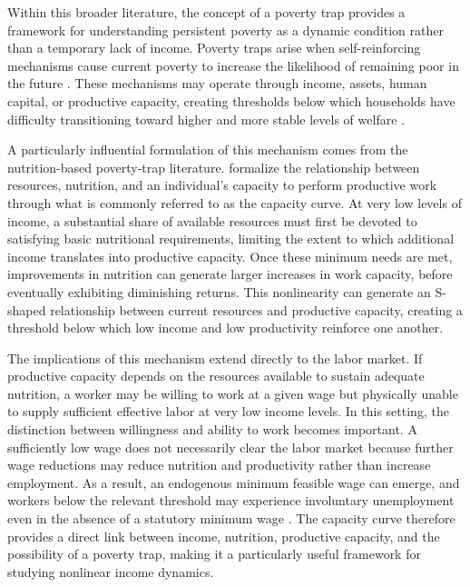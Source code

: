 \documentclass{article}
\begin{document}
Within this broader literature, the concept of a poverty trap provides a framework for understanding persistent poverty as a dynamic condition rather than a temporary lack of income. Poverty traps arise when self-reinforcing mechanisms cause current poverty to increase the likelihood of remaining poor in the future \parencite{kraay2014poverty}. These mechanisms may operate through income, assets, human capital, or productive capacity, creating thresholds below which households have difficulty transitioning toward higher and more stable levels of welfare \parencite{carterbarrett2006}.

A particularly influential formulation of this mechanism comes from the nutrition-based poverty-trap literature. \textcite{dasgupta1986} formalize the relationship between resources, nutrition, and an individual's capacity to perform productive work through what is commonly referred to as the capacity curve. At very low levels of income, a substantial share of available resources must first be devoted to satisfying basic nutritional requirements, limiting the extent to which additional income translates into productive capacity. Once these minimum needs are met, improvements in nutrition can generate larger increases in work capacity, before eventually exhibiting diminishing returns. This nonlinearity can generate an S-shaped relationship between current resources and productive capacity, creating a threshold below which low income and low productivity reinforce one another.

The implications of this mechanism extend directly to the labor market. If productive capacity depends on the resources available to sustain adequate nutrition, a worker may be willing to work at a given wage but physically unable to supply sufficient effective labor at very low income levels. In this setting, the distinction between willingness and ability to work becomes important. A sufficiently low wage does not necessarily clear the labor market because further wage reductions may reduce nutrition and productivity rather than increase employment. As a result, an endogenous minimum feasible wage can emerge, and workers below the relevant threshold may experience involuntary unemployment even in the absence of a statutory minimum wage \parencite{stiglitz1976,blissstern1978,dasgupta1986}. The capacity curve therefore provides a direct link between income, nutrition, productive capacity, and the possibility of a poverty trap, making it a particularly useful framework for studying nonlinear income dynamics.
\end{document}
